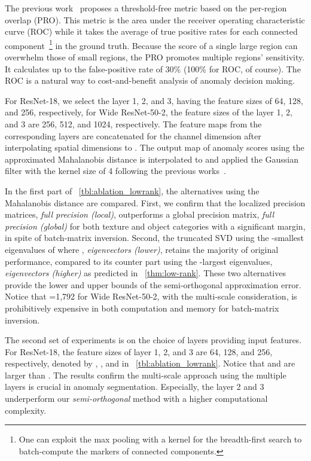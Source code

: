  The previous work~\cite{Bergmann2019} proposes a threshold-free metric based on the per-region overlap (PRO). This metric is the area under the receiver operating characteristic curve (ROC) while it takes the average of true positive rates for each connected component~\footnote{One can exploit the max pooling with a  kernel for the breadth-first search to batch-compute the markers of connected components.} in the ground truth. Because the score of a single large region can overwhelm those of small regions, the PRO promotes multiple regions' sensitivity. It calculates up to the false-positive rate of 30\% (100\% for ROC, of course).
The ROC is a natural way to cost-and-benefit analysis of anomaly decision making.

 For ResNet-18, we select the layer 1, 2, and 3, having the feature sizes of 64, 128, and 256, respectively, for Wide ResNet-50-2, the feature sizes of the layer 1, 2, and 3 are 256, 512, and 1024, respectively. The feature maps from the corresponding layers are concatenated for the channel dimension after interpolating spatial dimensions to . The output map of anomaly scores using the approximated Mahalanobis distance is interpolated to  and applied the Gaussian filter with the kernel size of 4 following the previous works~\cite{Cohen2020, Defard2020}. 

 In the first part of \tbl~\ref{tbl:ablation_lowrank}, the alternatives using the Mahalanobis distance are compared.
First, we confirm that the localized precision matrices, \textit{full precision (local)}, outperforms a global precision matrix, \textit{full precision (global)} for both texture and object categories with a significant margin, in spite of batch-matrix inversion. Second, the truncated SVD using the -smallest eigenvalues of  where , \textit{eigenvectors (lower)}, retains the majority of original performance, compared to its counter part using the -largest eigenvalues, \textit{eigenvectors (higher)} as predicted in \thm~\ref{thm:low-rank}. These two alternatives provide the lower and upper bounds of the semi-orthogonal approximation error. Notice that =1,792 for Wide ResNet-50-2, with the multi-scale consideration, is prohibitively expensive in both computation and memory for batch-matrix inversion.

 The second set of experiments is on the choice of layers providing input features. For ResNet-18, the feature sizes of layer 1, 2, and 3 are 64, 128, and 256, respectively, denoted by , , and  in \tbl~\ref{tbl:ablation_lowrank}. Notice that  and  are larger than . The results confirm the multi-scale approach using the multiple layers is crucial in anomaly segmentation. 
Especially, the layer 2 and 3 underperform our \textit{semi-orthogonal} method with a higher computational complexity.

